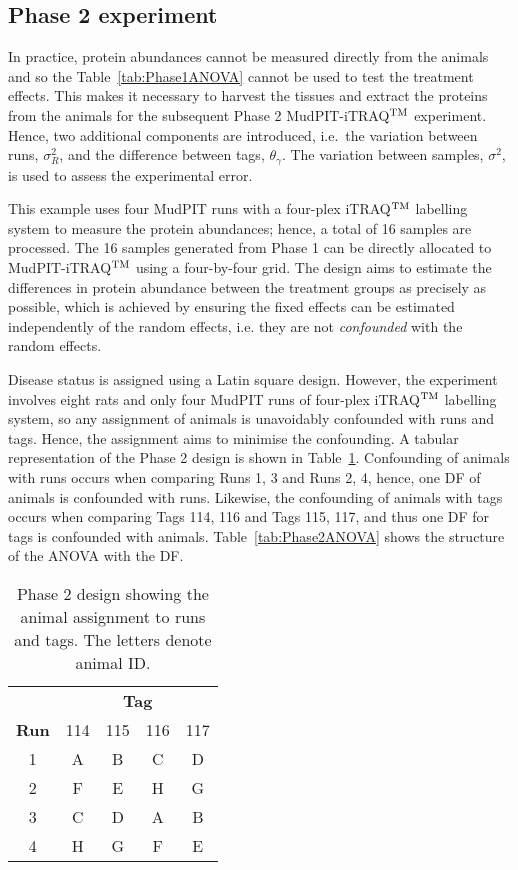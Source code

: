 \documentclass[article]{jss}
\begin{document}
\subsection{Phase 2 experiment}
\label{subsec:Phase2Exp}
In practice, protein abundances cannot be measured directly from the animals and so the Table~\ref{tab:Phase1ANOVA} cannot be used to test the treatment effects. This makes it necessary to harvest the tissues and extract the proteins from the animals for the subsequent Phase 2 MudPIT-iTRAQ$^{\rm TM}$ experiment. Hence, two additional components are introduced, i.e.\ the variation between runs, $\sigma_{R}^2$, and the difference between tags, $\theta_{\gamma}$. The variation between samples, $\sigma^2$, is used to assess the experimental error. 

This example uses four MudPIT runs with a four-plex iTRAQ$^{\rm TM}$ labelling system to measure the protein abundances; hence, a total of 16 samples are processed. The 16 samples generated from Phase 1 can be directly allocated to MudPIT-iTRAQ$^{\rm TM}$ using a four-by-four grid. The design aims to estimate the differences in protein abundance between the treatment groups as precisely as possible, which is achieved by ensuring the fixed effects can be estimated independently of the random effects, i.e. they are not \emph{confounded} with the random effects.

Disease status is assigned using a Latin square design. However, the experiment involves eight rats and only four MudPIT runs of four-plex iTRAQ$^{\rm TM}$ labelling system, so any assignment of animals is unavoidably confounded with runs and tags. Hence, the assignment aims to minimise the confounding. A tabular representation of the Phase 2 design is shown in Table~\ref{tab:phase2Design}. Confounding of animals with runs occurs when comparing Runs 1, 3 and Runs 2, 4, hence, one DF of animals is confounded with runs. Likewise, the confounding of animals with tags occurs when comparing Tags 114, 116 and Tags 115, 117, and thus one DF for tags is confounded with animals. Table~\ref{tab:Phase2ANOVA} shows the structure of the ANOVA with the DF.

\begin{table}[ht]
\centering
\caption{Phase 2 design showing the animal assignment to runs and tags. The letters denote animal ID.}
\begin{tabular}[t]{c|cccc}
 & \multicolumn{4}{c}{{\bf Tag}} \\
{\bf Run}  & 114 & 115 & 116 & 117 \\ 
\hline 
1 & A & B & C & D \\ 
2 & F & E & H & G \\ 
3 & C & D & A & B \\ 
4 & H & G & F & E \\ 
\end{tabular} 
\label{tab:phase2Design}
\end{table}
\end{document}
